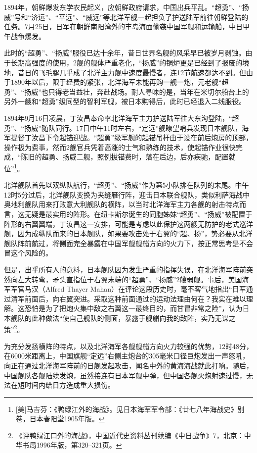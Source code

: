\documentclass[12pt,UTF8]{ctexbook}
\begin{document}
1894年，朝鲜爆发东学农民起义，应朝鲜政府请求，中国出兵平乱。“超勇”、“扬威”号和“济远”、“平远”、“威远”等北洋军舰一起担负了护送陆军前往朝鲜登陆的任务。7月25日，日军在朝鲜南阳湾外的丰岛海面偷袭中国军舰和运输船，中日甲午战争爆发。

此时的“超勇”、“扬威”服役已达十余年，昔日世界名舰的风采早已被岁月剥蚀。由于长期高强度的使用，2舰的舰体严重老化，“扬威”的锅炉更是已经到了报废的境地，昔日的飞毛腿几乎成了北洋主力舰中速度最慢者，连12节航速都达不到。但由于1890年以后，限于经费的紧张，北洋海军未能再购一舰一炮，元老舰“超勇”、“扬威”也只得老当益壮，奔赴战场。耐人寻味的是，当年在米切尔船台上的另外一艘和“超勇”级同型的智利军舰，被日本购得后，此时已经退入二线服役。

1894年9月16日凌晨，丁汝昌奉命率北洋海军主力护送陆军往大东沟登陆，“超勇”、“扬威”随队同行。17日中午11时左右，“定远”舰瞭望哨兵发现日本舰队，海军提督丁汝昌下令起锚迎战。“超勇”级军舰的起锚吊杆由于设在前后炮房的顶部，操作极为费事，然而2舰官兵凭着高涨的士气和熟练的技术，使起锚作业很快完成，“陈旧的超勇、扬威二舰，照例拔锚费时，落在后边，后亦疾驰，配置就位”\footnote{[美]马吉芬：《鸭绿江外的海战》。见日本海军军令部：《廿七八年海战史》别卷，日本春阳堂1905年版。}。

北洋舰队首先以双纵队航行，“超勇”、“扬威”作为第5小队排在队列的末尾。中午12时5分过后，北洋舰队变换为夹缝雁行阵，迎击日本联合舰队，类似利萨海战中奥地利舰队用来打败意大利舰队的横阵，以当时北洋海军主力各舰的射击特点而言，这无疑是最实用的阵形。在纽卡斯尔诞生的同胞姊妹“超勇”、“扬威”被配置于阵形的右翼翼端，丁汝昌这一安排，可能是考虑以此保护这两艘无防护的老式巡洋舰，因为成纵队而来的日本舰队，如果要攻击处于右翼的“超、扬”，势必要从北洋舰队阵前航过，将侧面完全暴露在中国军舰舰艏方向的火力下，按正常思考是不会冒这个风险的。

但是，出乎所有人的意料，日本舰队因为发生严重的指挥失误，在北洋海军阵前突然向左大转弯，矛头直指位于右翼末端的“超勇”、“扬威”2艘弱舰。事后，美国海军军官马汉（Alfred Thayer Mahan）在评论这段历史时，毫不客气地指出“日军通过清军前面后，向右翼突进。采取这种前面通过的运动法理由何在？我实在难以理解。这恐怕是为了把炮火集中敌之右翼这一最终目的，而甘冒非常之险”，认为日本舰队的此种做法“使自己舰队的侧面，暴露于舰艏向我的敌阵，实乃无谋之策”\footnote{《评鸭绿江口外的海战》，中国近代史资料丛刊续编《中日战争》7，北京：中华书局1996年版，第320--321页。}。

为充分发扬横阵的特点，以及北洋海军各舰舰艏方向火力较强的优势，12时48分，在6000米距离上，中国旗舰“定远”右侧主炮台的305毫米口径巨炮发出一声怒吼，向正在通过北洋海军阵前的日舰发起攻击，闻名中外的黄海海战就此打响。随后，中国舰队各舰陆续发炮，虽然接连有日本军舰中弹，但中国各舰火炮射速过慢，无法在短时间内给日方造成重大损伤。
\end{document}

